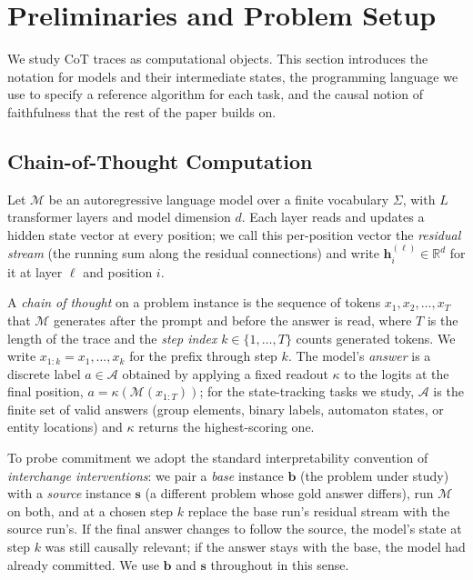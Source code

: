\documentclass[11pt]{article}
\newcommand{\stepk}{k}
\begin{document}
\section{Preliminaries and Problem Setup}
\label{sec:prelim}

We study CoT traces as computational objects. This section introduces the
notation for models and their intermediate states, the programming language we
use to specify a reference algorithm for each task, and the causal notion of
faithfulness that the rest of the paper builds on.

\subsection{Chain-of-Thought Computation}
\label{sec:prelim-cot}

Let $\mathcal{M}$ be an autoregressive language model over a finite vocabulary
$\Sigma$, with $L$ transformer layers and model dimension $d$. Each layer reads
and updates a hidden state vector at every position; we call this per-position
vector the \emph{residual stream} (the running sum along the residual
connections) and write $\mathbf{h}^{(\ell)}_i \in \mathbb{R}^{d}$ for it at
layer $\ell$ and position $i$.

A \emph{chain of thought} on a problem instance is the sequence of tokens
$x_{1}, x_{2}, \ldots, x_{T}$ that $\mathcal{M}$ generates after the prompt and
before the answer is read, where $T$ is the length of the trace and the
\emph{step index} $\stepk \in \{1, \ldots, T\}$ counts generated tokens. We
write $x_{1{:}\stepk} = x_{1}, \ldots, x_{\stepk}$ for the prefix through step
$\stepk$. The model's \emph{answer} is a discrete label $a \in \mathcal{A}$
obtained by applying a fixed readout $\kappa$ to the logits at the final
position, $a = \kappa(\mathcal{M}(x_{1{:}T}))$; for the state-tracking tasks we
study, $\mathcal{A}$ is the finite set of valid answers (group elements, binary
labels, automaton states, or entity locations) and $\kappa$ returns the
highest-scoring one.

To probe commitment we adopt the standard interpretability convention of
\emph{interchange interventions}: we pair a \emph{base} instance $\mathbf{b}$
(the problem under study) with a \emph{source} instance $\mathbf{s}$ (a
different problem whose gold answer differs), run $\mathcal{M}$ on both, and at
a chosen step $\stepk$ replace the base run's residual stream with the source
run's. If the final answer changes to follow the source, the model's state at
step $\stepk$ was still causally relevant; if the answer stays with the base,
the model had already committed. We use $\mathbf{b}$ and $\mathbf{s}$ throughout
in this sense.
\end{document}

